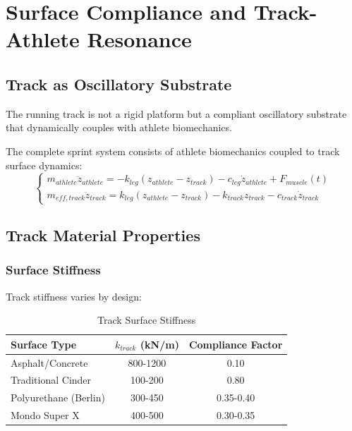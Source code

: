 \section{Surface Compliance and Track-Athlete Resonance}

\subsection{Track as Oscillatory Substrate}

The running track is not a rigid platform but a compliant oscillatory substrate that dynamically couples with athlete biomechanics.

\begin{definition}
The complete sprint system consists of athlete biomechanics coupled to track surface dynamics:
\begin{equation}
\begin{cases}
m_{athlete} \ddot{z}_{athlete} = -k_{leg}(z_{athlete} - z_{track}) - c_{leg}\dot{z}_{athlete} + F_{muscle}(t) \\
m_{eff,track} \ddot{z}_{track} = k_{leg}(z_{athlete} - z_{track}) - k_{track}z_{track} - c_{track}\dot{z}_{track}
\end{cases}
\label{eq:track_athlete_coupled}
\end{equation}
\end{definition}

\subsection{Track Material Properties}

\subsubsection{Surface Stiffness}

Track stiffness varies by design:

\begin{table}[H]
\centering
\caption{Track Surface Stiffness}
\begin{tabular}{lcc}
\toprule
Surface Type & $k_{track}$ (kN/m) & Compliance Factor \\
\midrule
Asphalt/Concrete & 800-1200 & 0.10 \\
Traditional Cinder & 100-200 & 0.80 \\
Polyurethane (Berlin) & 300-450 & 0.35-0.40 \\
Mondo Super X & 400-500 & 0.30-0.35 \\
\bottomrule
\end{tabular}
\end{table}

